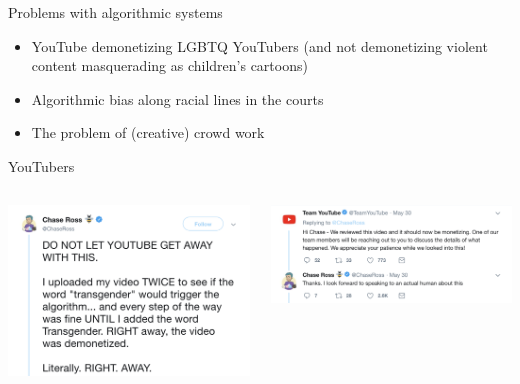 \documentclass[presentation]{subfiles}
\begin{document}
\begin{frame}{Problems with algorithmic systems}
\begin{itemize}
  \item YouTube demonetizing LGBTQ YouTubers (and not demonetizing violent content masquerading as children's cartoons)
  \item Algorithmic bias along racial lines in the courts
  \item The problem of (creative) crowd work 
\end{itemize}
\end{frame}

\begin{frame}{YouTubers}
  \begin{columns}[T]
    \begin{column}{0.49\textwidth}
      \centering
      \includegraphics[max width=\linewidth,keepaspectratio]{figures/lgbtq_tweet.png}
    \end{column}
    \begin{column}{0.49\textwidth}
      \centering
      \includegraphics[max width=\linewidth,keepaspectratio]{figures/lgbtq_followup.png}
    \end{column}
  \end{columns}
\end{frame}
\end{document}

